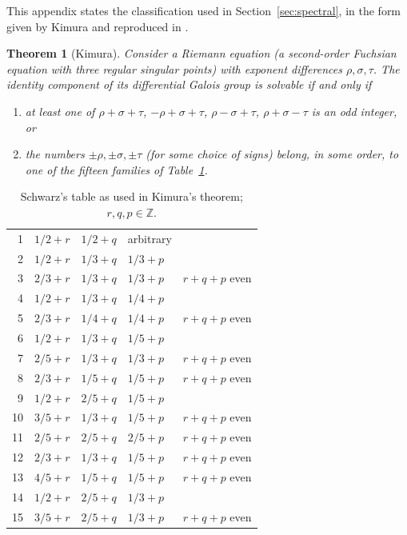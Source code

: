 \documentclass[11pt]{article}
\numberwithin{equation}{section}
\newtheorem{theorem}{Theorem}[section]
\theoremstyle{definition}
\theoremstyle{remark}
\newcommand{\Z}{\mathbb Z}
\begin{document}
This appendix states the classification used in Section~\ref{sec:spectral}, in the form given by Kimura
\cite{Kimura69} and reproduced in \cite[Appendix, Theorem~4]{PSM23}.

\begin{theorem}[Kimura]\label{thm:kimura}
Consider a Riemann equation (a second-order Fuchsian equation with three regular singular points) with exponent
differences $\rho,\sigma,\tau$. The identity component of its differential Galois group is solvable if and only if
\begin{enumerate}[label=(\Roman*)]
\item at least one of $\rho+\sigma+\tau$, $-\rho+\sigma+\tau$, $\rho-\sigma+\tau$, $\rho+\sigma-\tau$ is an odd
integer, or
\item the numbers $\pm\rho,\pm\sigma,\pm\tau$ (for some choice of signs) belong, in some order, to one of the fifteen
families of Table~\ref{tab:schwarz}.
\end{enumerate}
\end{theorem}

\begin{table}[h]
\centering
\begin{tabular}{rllll}
\toprule
1 & $1/2+r$ & $1/2+q$ & arbitrary & \\
2 & $1/2+r$ & $1/3+q$ & $1/3+p$ & \\
3 & $2/3+r$ & $1/3+q$ & $1/3+p$ & $r+q+p$ even\\
4 & $1/2+r$ & $1/3+q$ & $1/4+p$ & \\
5 & $2/3+r$ & $1/4+q$ & $1/4+p$ & $r+q+p$ even\\
6 & $1/2+r$ & $1/3+q$ & $1/5+p$ & \\
7 & $2/5+r$ & $1/3+q$ & $1/3+p$ & $r+q+p$ even\\
8 & $2/3+r$ & $1/5+q$ & $1/5+p$ & $r+q+p$ even\\
9 & $1/2+r$ & $2/5+q$ & $1/5+p$ & \\
10 & $3/5+r$ & $1/3+q$ & $1/5+p$ & $r+q+p$ even\\
11 & $2/5+r$ & $2/5+q$ & $2/5+p$ & $r+q+p$ even\\
12 & $2/3+r$ & $1/3+q$ & $1/5+p$ & $r+q+p$ even\\
13 & $4/5+r$ & $1/5+q$ & $1/5+p$ & $r+q+p$ even\\
14 & $1/2+r$ & $2/5+q$ & $1/3+p$ & \\
15 & $3/5+r$ & $2/5+q$ & $1/3+p$ & $r+q+p$ even\\
\bottomrule
\end{tabular}
\caption{Schwarz's table as used in Kimura's theorem; $r,q,p\in\Z$.}\label{tab:schwarz}
\end{table}
\end{document}
